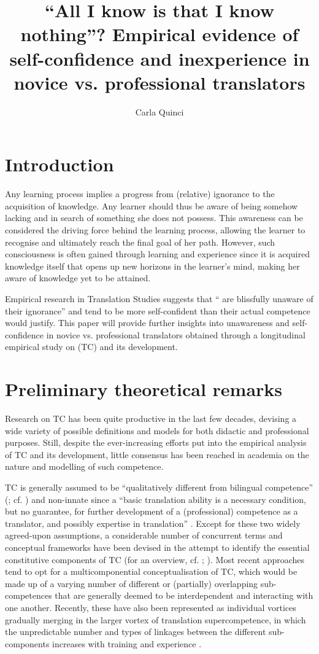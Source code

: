 \documentclass[output=paper]{LSP/langsci}
\title{``All I know is that I know nothing''? Empirical evidence of self-confidence and inexperience in novice vs. professional translators}
\author{Carla Quinci}
\affiliation{Università di Trieste}
\begin{document}
\section{Introduction}

Any learning process implies a progress from (relative) ignorance to the acquisition of knowledge. Any learner should thus be aware of being somehow lacking and in search of something she does not possess. This awareness can be considered the driving force behind the learning process, allowing the learner to recognise and ultimately reach the final goal of her path. However, such consciousness is often gained through learning and experience since it is acquired knowledge itself that opens up new horizons in the learner's mind, making her aware of knowledge yet to be attained.

Empirical research in Translation Studies suggests that `` are blissfully unaware of their ignorance'' \citep[67]{Jaaskelainen1996} and tend to be more self-confident than their actual competence would justify. This paper will provide further insights into unawareness and self-confidence in novice vs. professional translators obtained through a longitudinal empirical study on  (TC) and its development.

\section{Preliminary theoretical remarks}

Research on TC has been quite productive in the last few decades, devising a wide variety of possible definitions and models for both didactic and professional purposes. Still, despite the ever-increasing efforts put into the empirical analysis of TC and its development, little consensus has been reached in academia on the nature and modelling of such competence.

TC is generally assumed to be ``qualitatively different from bilingual competence'' (\citealt[44--45]{PACTE2002}; cf. \citealt{Lorscher2012}) and non-innate \citep[121]{Shreve1997} since a ``basic translation ability is a necessary condition, but no guarantee, for further development of a (professional) competence as a translator, and possibly expertise in translation'' \citep[12]{Englund2005}. Except for these two widely agreed-upon assumptions, a considerable number of concurrent terms and conceptual frameworks have been devised in the attempt to identify the essential constitutive components of TC (for an overview, cf. \citealt{Orozco2002}; \citealt{Quinci2015a}). Most recent approaches tend to opt for a multicomponential conceptualisation of TC, which would be made up of a varying number of different or (partially) overlapping sub-competences that are generally deemed to be interdependent and interacting with one another. Recently, these have also been represented as individual vortices gradually merging in the larger vortex of translation supercompetence, in which the unpredictable number and types of linkages between the different sub-components increases with training and experience \citep{Kiraly2013}.
\end{document}
